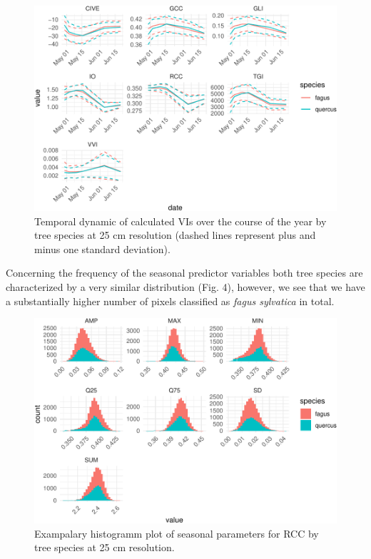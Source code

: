 \documentclass[]{article}
\begin{document}
\begin{figure}[H]

{\centering \includegraphics{report_files/figure-latex/predictor_plots_indices-1} 

}

\caption{Temporal dynamic of calculated VIs over the course of the year by tree species at 25 cm resolution (dashed lines represent plus and minus one standard deviation).}\label{fig:predictor_plots_indices}
\end{figure}

Concerning the frequency of the seasonal predictor variables both tree
species are characterized by a very similar distribution (Fig. 4),
however, we see that we have a substantially higher number of pixels
classified as \emph{fagus sylvatica} in total.

\begin{figure}[H]

{\centering \includegraphics{report_files/figure-latex/example_seasonal_plots-1} 

}

\caption{Exampalary histogramm plot of seasonal parameters for RCC by tree species at 25 cm resolution.}\label{fig:example_seasonal_plots}
\end{figure}
\end{document}
